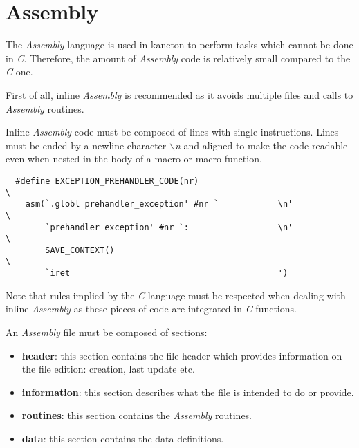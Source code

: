 %
%
%
%
%
%

%
%

\section{Assembly}
\label{section:assembly}

The \textit{Assembly} language is used in kaneton to perform tasks which
cannot be done in \textit{C}. Therefore, the amount of \textit{Assembly}
code is relatively small compared to the \textit{C} one.

First of all, inline \textit{Assembly} is recommended as it avoids multiple
files and calls to \textit{Assembly} routines.

Inline \textit{Assembly} code must be composed of lines with single
instructions. Lines must be ended by a newline character \textit{$\backslash$n}
and aligned to make the code readable even when nested in the body of a macro
or macro function.

\begin{verbatim}
  #define EXCEPTION_PREHANDLER_CODE(nr)                                 \
    asm(`.globl prehandler_exception' #nr `            \n'              \
        `prehandler_exception' #nr `:                  \n'              \
        SAVE_CONTEXT()                                                  \
        `iret                                          ')
\end{verbatim}

Note that rules implied by the \textit{C} language must be respected when
dealing with inline \textit{Assembly} as these pieces of code are integrated
in \textit{C} functions.

An \textit{Assembly} file must be composed of sections:

\begin{itemize}
  \item
    \textbf{header}: this section contains the file header which provides
    information on the file edition: creation, last update etc.
  \item
    \textbf{information}: this section describes what the file is intended
    to do or provide.
  \item
    \textbf{routines}: this section contains the \textit{Assembly} routines.
  \item
    \textbf{data}: this section contains the data definitions.
\end{itemize}

